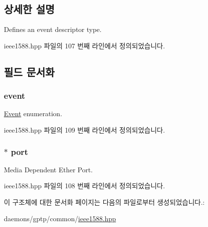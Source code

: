 \subsection{상세한 설명}
Defines an event descriptor type. 

ieee1588.\+hpp 파일의 107 번째 라인에서 정의되었습니다.



\subsection{필드 문서화}
\subsubsection[{\texorpdfstring{event}{event}}]{ event}\hypertarget{structevent__descriptor__t_acf61400dc69c74e927a476661f47141d}{}\label{structevent__descriptor__t_acf61400dc69c74e927a476661f47141d}


\hyperlink{class_event}{Event} enumeration. 



ieee1588.\+hpp 파일의 109 번째 라인에서 정의되었습니다.

\subsubsection[{\texorpdfstring{port}{port}}]{$\ast$ port}\hypertarget{structevent__descriptor__t_aa621204f6a0407aae7cf9885124c883a}{}\label{structevent__descriptor__t_aa621204f6a0407aae7cf9885124c883a}


Media Dependent Ether Port. 



ieee1588.\+hpp 파일의 108 번째 라인에서 정의되었습니다.



이 구조체에 대한 문서화 페이지는 다음의 파일로부터 생성되었습니다.\+:\begin{DoxyCompactItemize}
\item 
daemons/gptp/common/\hyperlink{ieee1588_8hpp}{ieee1588.\+hpp}\end{DoxyCompactItemize}
